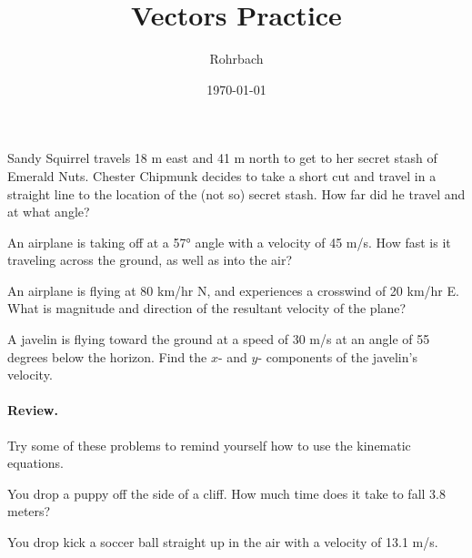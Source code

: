 \documentclass[10pt]{exam}
\title{Vectors Practice}
\author{Rohrbach}
\date{\today}
\begin{document}
\maketitle

\begin{questions}

\question
  Sandy Squirrel travels 18 m east and 41 m north to get to her secret stash of Emerald Nuts.  Chester Chipmunk decides to take a short cut and travel in a straight line to the location of the (not so) secret stash.  How far did he travel and at what angle?
  \vs

\question
  An airplane is taking off at a 57° angle with a velocity of 45 m/s.  How fast is it traveling across the ground, as well as into the air?
  \vs

\question
  An airplane is flying at 80 km/hr N, and experiences a crosswind of 20 km/hr E.  What is magnitude and direction of the resultant velocity of the plane?
  \vs


\pagebreak

\question
  A javelin is flying toward the ground at a speed of 30 m/s at an angle of 55 degrees below the horizon.  Find the $x$- and $y$- components of the javelin's velocity.
  \vs

\begin{EnvUplevel}
  \paragraph{Review.} 
    Try some of these problems to remind yourself how to use the kinematic equations.
\end{EnvUplevel}

\question  
  You drop a puppy off the side of a cliff.  How much time does it take to fall 3.8 meters?
  \vs

\question  
  You drop kick a soccer ball straight up in the air with a velocity of 13.1 m/s.  
  


\end{questions}
\end{document}
